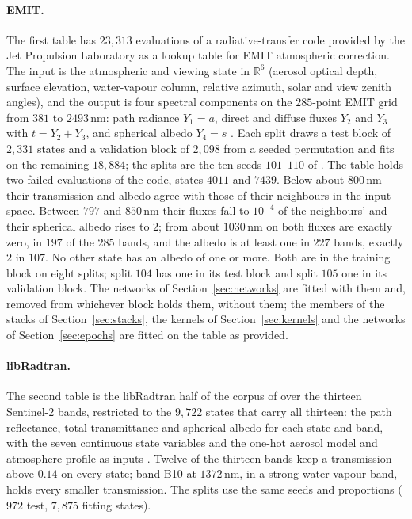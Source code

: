 \documentclass[11pt]{article}
\theoremstyle{remark}
\newcommand{\1}{\mathbf{1}}
\begin{document}
\paragraph{EMIT.} The first table has $23{,}313$ evaluations of a radiative-transfer code provided by the Jet
Propulsion Laboratory as a lookup table for EMIT atmospheric correction. The input is the atmospheric and viewing
state in $\mathbb R^6$ (aerosol optical depth, surface elevation, water-vapour column, relative azimuth, solar and view
zenith angles), and the output is four spectral components on the $285$-point EMIT grid from $381$ to $2493$\,nm: path
radiance $Y_1=a$, direct and diffuse fluxes $Y_2$ and $Y_3$ with $t=Y_2+Y_3$, and spherical albedo $Y_4=s$
\cite{shmalo2}. Each split draws a test block of $2{,}331$ states and a validation block of $2{,}098$ from a seeded
permutation and fits on the remaining $18{,}884$; the splits are the ten seeds $101$--$110$ of \cite{shmalo2}. The table
holds two failed evaluations of the code, states $4011$ and $7439$. Below about $800$\,nm their transmission and albedo
agree with those of their neighbours in the input space. Between $797$ and $850$\,nm their fluxes fall to $10^{-4}$ of
the neighbours' and their spherical albedo rises to $2$; from about $1030$\,nm on both fluxes are exactly zero, in
$197$ of the $285$ bands, and the albedo is at least one in $227$ bands, exactly $2$ in $107$. No other state has an
albedo of one or more. Both are in the training block on eight splits; split $104$ has one in its test block and split
$105$ one in its validation block. The networks of
Section~\ref{sec:networks} are fitted with them and, removed from whichever block holds them, without them; the members
of the stacks of Section~\ref{sec:stacks}, the kernels of Section~\ref{sec:kernels} and the networks of
Section~\ref{sec:epochs} are fitted on the table as provided.

\paragraph{libRadtran.} The second table is the libRadtran half of the corpus of \cite{pkan} over the thirteen
Sentinel-2 bands, restricted to the $9{,}722$ states that carry all thirteen: the path reflectance, total
transmittance and spherical albedo for each state and band, with the seven continuous state variables and the one-hot
aerosol model and atmosphere profile as inputs \cite{shmalo2}. Twelve of the thirteen bands keep a transmission above
$0.14$ on every state; band B10 at $1372$\,nm, in a strong water-vapour band, holds every smaller transmission. The
splits use the same seeds and proportions ($972$ test, $7{,}875$ fitting states).
\end{document}
